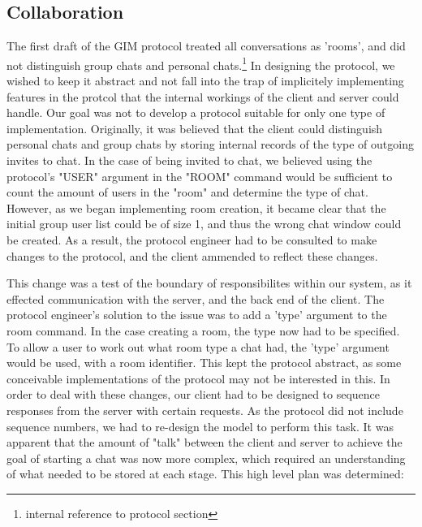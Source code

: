 \subsection{Collaboration}

The first draft of the GIM protocol treated all conversations as 'rooms', and did not distinguish group chats and personal chats.\footnote{internal reference to protocol section} In designing the protocol, we wished to keep it abstract and not fall into the trap of implicitely implementing features in the protcol that the internal workings of the client and server could handle. Our goal was not to develop a protocol suitable for only one type of implementation. Originally, it was believed that the client could distinguish personal chats and group chats by storing internal records of the type of outgoing invites to chat. In the case of being invited to chat, we believed using the protocol's "USER" argument in the "ROOM" command would be sufficient to count the amount of users in the "room" and determine the type of chat. However, as we began implementing room creation, it became clear that the initial group user list could be of size 1, and thus the wrong chat window could be created. As a result, the protocol engineer had to be consulted to make changes to the protocol, and the client ammended to reflect these changes. 

This change was a test of the boundary of responsibilites within our system, as it effected communication with the server, and the back end of the client. The protocol engineer's solution to the issue was to add a 'type' argument to the room command. In the case creating a room, the type now had to be specified. To allow a user to work out what room type a chat had, the 'type' argument would be used, with a room identifier. This kept the protocol abstract, as some conceivable implementations of the protocol may not be interested in this. In order to deal with these changes, our client had to be designed to sequence responses from the server with certain requests. As the protocol did not include sequence numbers, we had to re-design the model to perform this task. It was apparent that the amount of "talk" between the client and server to achieve the goal of starting a chat was now more complex, which required an understanding of what needed to be stored at each stage. This high level plan was determined:

